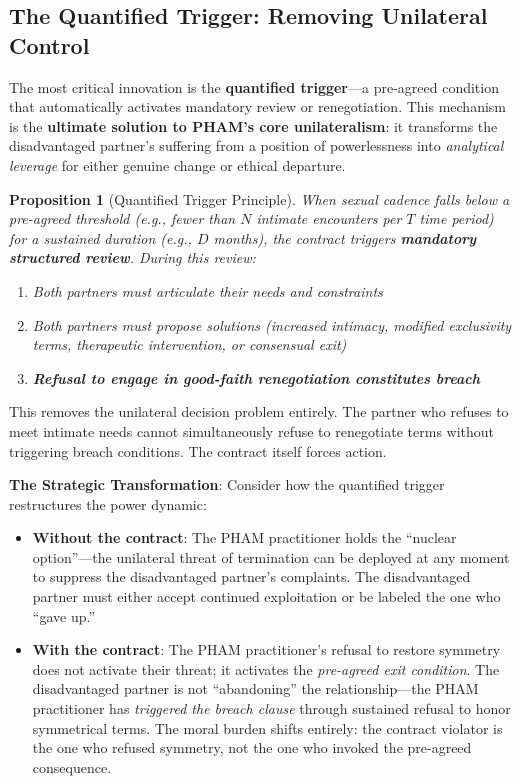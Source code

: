 \documentclass[12pt,openany]{book}
\newtheorem{proposition}{Proposition}[chapter]
\numberwithin{equation}{chapter}
\begin{document}
\subsection{The Quantified Trigger: Removing Unilateral Control}

The most critical innovation is the \textbf{quantified trigger}---a pre-agreed condition that automatically activates mandatory review or renegotiation. This mechanism is the \textbf{ultimate solution to PHAM's core unilateralism}: it transforms the disadvantaged partner's suffering from a position of powerlessness into \textit{analytical leverage} for either genuine change or ethical departure.

\begin{proposition}[Quantified Trigger Principle]
When sexual cadence falls below a pre-agreed threshold (e.g., fewer than $N$ intimate encounters per $T$ time period) for a sustained duration (e.g., $D$ months), the contract triggers \textbf{mandatory structured review}. During this review:
\begin{enumerate}
    \item Both partners must articulate their needs and constraints
    \item Both partners must propose solutions (increased intimacy, modified exclusivity terms, therapeutic intervention, or consensual exit)
    \item \textbf{Refusal to engage in good-faith renegotiation constitutes breach}
\end{enumerate}
\end{proposition}

This removes the unilateral decision problem entirely. The partner who refuses to meet intimate needs cannot simultaneously refuse to renegotiate terms without triggering breach conditions. The contract itself forces action.

\textbf{The Strategic Transformation}: Consider how the quantified trigger restructures the power dynamic:

\begin{itemize}
    \item \textbf{Without the contract}: The PHAM practitioner holds the ``nuclear option''---the unilateral threat of termination can be deployed at any moment to suppress the disadvantaged partner's complaints. The disadvantaged partner must either accept continued exploitation or be labeled the one who ``gave up.''
    
    \item \textbf{With the contract}: The PHAM practitioner's refusal to restore symmetry does not activate their threat; it activates the \textit{pre-agreed exit condition}. The disadvantaged partner is not ``abandoning'' the relationship---the PHAM practitioner has \textit{triggered the breach clause} through sustained refusal to honor symmetrical terms. The moral burden shifts entirely: the contract violator is the one who refused symmetry, not the one who invoked the pre-agreed consequence.
\end{itemize}
\end{document}
